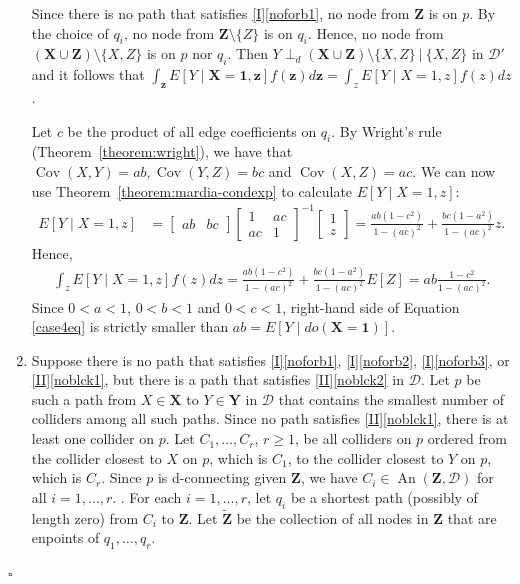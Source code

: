 \documentclass[11pt,a4paper]{article}
\newcommand\given[1][]{\:#1\vert\:}
\newcommand{\dsepp}{\perp_{d}}
\newenvironment{proofof}[1][]{\begin{trivlist}
   \item[\hskip \labelsep {\bfseries Proof of #1.}]}{\hfill{}$\square$\end{trivlist}}
\DeclareMathOperator{\Cov}{Cov}
\DeclareMathOperator{\An}{An}
\newcommand{\g}[1][G]{\mathcal{#1}}
\begin{document}
\begin{proofof}[Theorem~\ref{theorem:completeness ac}]
\begin{enumerate}[label=(\roman*)]
Since there is no path that satisfies \ref{I}\ref{noforb1}, no node from $\mathbf{Z}$ is on $p$. By the choice of $q_i$, no node from $\mathbf{Z} \setminus \{Z\}$ is on $q_i$. Hence, no node from $(\mathbf{X} \cup \mathbf{Z}) \setminus \{X,Z\}$ is on $p$ nor $q_i$. Then  $Y \dsepp (\mathbf{X} \cup \mathbf{Z}) \setminus \{X,Z\} \given \{X,Z\}$ in $\g[D']$ and it follows that $\int_\mathbf{z}E[Y \mid \mathbf{X=1},\mathbf{z}]f(\mathbf{z})d\mathbf{z} =\int_z E[Y \mid X=1,z]f(z)dz$.

Let $c$ be the product of all edge coefficients  on $q_i$.
By Wright's rule (Theorem~\ref{theorem:wright}), we have that $\Cov(X,Y) = ab, \Cov(Y,Z) =bc$ and $\Cov(X,Z) =ac$. We can now use Theorem~\ref{theorem:mardia-condexp} to calculate $E[ Y \mid X=1,z]$:
\begin{align*}
 E[ Y \mid X=1,z] &= \begin{bmatrix}
       ab & bc
     \end{bmatrix}
     \begin{bmatrix}
       1 & ac \\
       ac & 1
     \end{bmatrix}^{-1}
     \begin{bmatrix}
       1  \\
       z
     \end{bmatrix}
     = \frac{ab(1-c^2)}{1-(ac)^2} + \frac{bc(1-a^2)}{1-(ac)^2}z.
\end{align*}
Hence, 
\begin{align}
\int_z E[Y \mid X=1,z]f(z)dz =\frac{ab(1-c^2)}{1-(ac)^2} + \frac{bc(1-a^2)}{1-(ac)^2}E[Z]
=ab \frac{1-c^2}{1-(ac)^2}. \label{case4eq}
\end{align}
Since $0<a<1$, $0<b<1$ and $0<c<1$, right-hand side of Equation \eqref{case4eq} is strictly smaller than $ab = E[Y \mid do(\mathbf{X} =\mathbf{1})]$.
\item\label{case5} {Suppose there is no path that satisfies \ref{I}\ref{noforb1}, \ref{I}\ref{noforb2}, \ref{I}\ref{noforb3}, or \ref{II}\ref{noblck1}, but there is a path that satisfies \ref{II}\ref{noblck2} in $\g[D]$.
Let $p$ be such a path from $X \in \mathbf{X}$ to $Y \in \mathbf{Y}$ in $\g[D]$ that contains the smallest number of colliders among all such paths.
Since no path satisfies \ref{II}\ref{noblck1}, there is at least one collider on $p$. Let $C_1, \dots , C_r$, $r \ge1$, be all colliders on $p$ ordered from the collider closest to $X$ on $p$, which is $C_1$, to the collider closest to $Y$ on $p$, which is $C_r$. Since $p$ is d-connecting given $\mathbf{Z}$, we have $C_i \in \An(\mathbf{Z},\g[D])$ for all $i=1,\dots,r$. .
For each $i=1,\dots,r$, let $q_i$ be a shortest path (possibly of length zero) from $C_i$ to $\mathbf{Z}$. 
{Let $\mathbf{\tilde{Z}}$ be the collection of all nodes in $\mathbf{Z}$ that are enpoints of $ q_1, \dots, q_r$.}
 
}
\end{enumerate}
\end{proofof}
\end{document}
